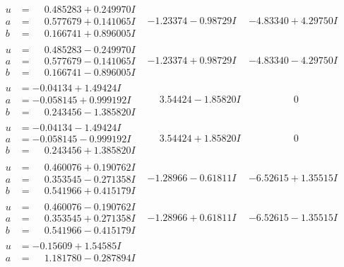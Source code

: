 \documentclass[1p]{elsarticle_modified}
\theoremstyle{definition}
\begin{document}
$$\begin{array}{c|c|c}
 \hline 
\begin{aligned}
u &= \phantom{-}0.485283 + 0.249970 I \\
a &= \phantom{-}0.577679 + 0.141065 I \\
b &= \phantom{-}0.166741 + 0.896005 I\end{aligned}
 & -1.23374 - 0.98729 I & -4.83340 + 4.29750 I \\ \hline\begin{aligned}
u &= \phantom{-}0.485283 - 0.249970 I \\
a &= \phantom{-}0.577679 - 0.141065 I \\
b &= \phantom{-}0.166741 - 0.896005 I\end{aligned}
 & -1.23374 + 0.98729 I & -4.83340 - 4.29750 I \\ \hline\begin{aligned}
u &= -0.04134 + 1.49424 I \\
a &= -0.058145 + 0.999192 I \\
b &= \phantom{-}0.243456 - 1.385820 I\end{aligned}
 & \phantom{-}3.54424 - 1.85820 I & \phantom{-0.000000 } 0 \\ \hline\begin{aligned}
u &= -0.04134 - 1.49424 I \\
a &= -0.058145 - 0.999192 I \\
b &= \phantom{-}0.243456 + 1.385820 I\end{aligned}
 & \phantom{-}3.54424 + 1.85820 I & \phantom{-0.000000 } 0 \\ \hline\begin{aligned}
u &= \phantom{-}0.460076 + 0.190762 I \\
a &= \phantom{-}0.353545 - 0.271358 I \\
b &= \phantom{-}0.541966 + 0.415179 I\end{aligned}
 & -1.28966 - 0.61811 I & -6.52615 + 1.35515 I \\ \hline\begin{aligned}
u &= \phantom{-}0.460076 - 0.190762 I \\
a &= \phantom{-}0.353545 + 0.271358 I \\
b &= \phantom{-}0.541966 - 0.415179 I\end{aligned}
 & -1.28966 + 0.61811 I & -6.52615 - 1.35515 I \\ \hline\begin{aligned}
u &= -0.15609 + 1.54585 I \\
a &= \phantom{-}1.181780 - 0.287894 I \\

\end{aligned}
\end{array}$$
\end{document}
